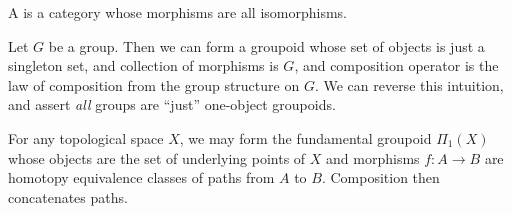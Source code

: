 \begin{node}[Groupoids]\label{cat-000B}%
\begin{definition}\label{cat-000C}%
A  is a category whose morphisms are all isomorphisms.
\end{definition}
\begin{node}[Examples]\label{cat-000D}%
\begin{node}\label{cat-000I}%
Let $G$ be a group. Then we can form a groupoid whose set of objects is
just a singleton set, and collection of morphisms is $G$, and
composition operator is the law of composition from the group structure
on $G$. We can reverse this intuition, and assert \emph{all} groups are
``just'' one-object groupoids.
\end{node}

\begin{node}\label{cat-000E}%
For any topological space $X$, we may form the fundamental groupoid
$\Pi_{1}(X)$ whose objects are the set of underlying points of $X$ and
morphisms $f\colon A\to B$ are homotopy equivalence classes of paths
from $A$ to $B$.  Composition then concatenates paths.
\end{node}
\end{node}
\end{node}

